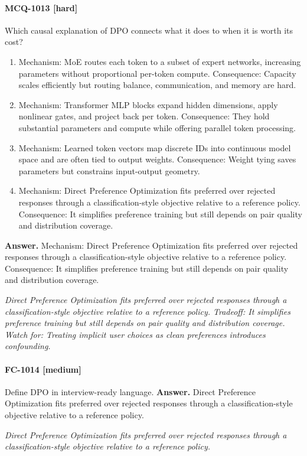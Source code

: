 \paragraph{MCQ-1013 [hard]} Which causal explanation of DPO connects what it does to when it is worth its cost?
\begin{enumerate}[label=\Alph*.]
\item Mechanism: MoE routes each token to a subset of expert networks, increasing parameters without proportional per-token compute. Consequence: Capacity scales efficiently but routing balance, communication, and memory are hard.
\item Mechanism: Transformer MLP blocks expand hidden dimensions, apply nonlinear gates, and project back per token. Consequence: They hold substantial parameters and compute while offering parallel token processing.
\item Mechanism: Learned token vectors map discrete IDs into continuous model space and are often tied to output weights. Consequence: Weight tying saves parameters but constrains input-output geometry.
\item Mechanism: Direct Preference Optimization fits preferred over rejected responses through a classification-style objective relative to a reference policy. Consequence: It simplifies preference training but still depends on pair quality and distribution coverage.
\end{enumerate}
\noindent\textbf{Answer.} Mechanism: Direct Preference Optimization fits preferred over rejected responses through a classification-style objective relative to a reference policy. Consequence: It simplifies preference training but still depends on pair quality and distribution coverage.
\par\textit{Direct Preference Optimization fits preferred over rejected responses through a classification-style objective relative to a reference policy. Tradeoff: It simplifies preference training but still depends on pair quality and distribution coverage. Watch for: Treating implicit user choices as clean preferences introduces confounding.}
\paragraph{FC-1014 [medium]} Define DPO in interview-ready language.
\noindent\textbf{Answer.} Direct Preference Optimization fits preferred over rejected responses through a classification-style objective relative to a reference policy.
\par\textit{Direct Preference Optimization fits preferred over rejected responses through a classification-style objective relative to a reference policy.}
